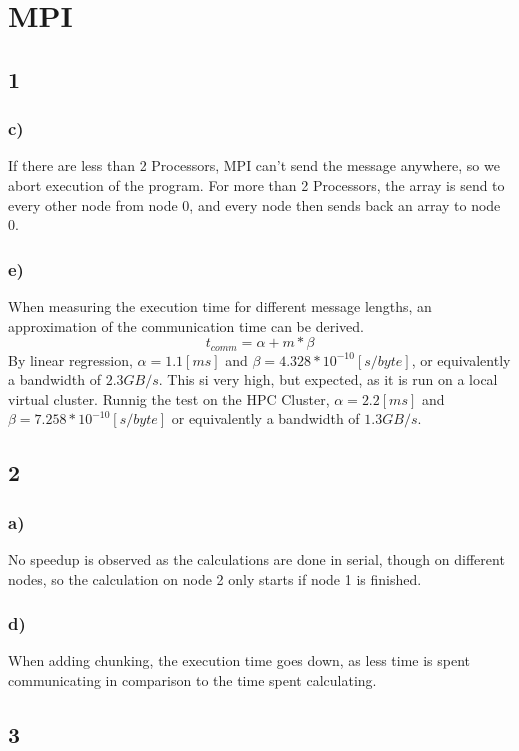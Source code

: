 \documentclass{article}
\begin{document}
\section{MPI}
\subsection{1}
\subsubsection{c)}
If there are less than 2 Processors, MPI can't send the message anywhere, so we abort execution of the program.
For more than 2 Processors, the array is send to every other node from node 0, and every node then sends back an array to node 0.
\subsubsection{e)}
When measuring the execution time for different message lengths, an approximation of the communication time can be derived.
\begin{equation}
	t_{comm} = \alpha + m * \beta
\end{equation}
By linear regression, $\alpha = 1.1 [ms]$ and $\beta = 4.328*10^{-10} [s/byte]$, or equivalently a bandwidth of $2.3 GB/s$. This si very high, but expected, as it is run on a local virtual cluster.
Runnig the test on the HPC Cluster, $\alpha = 2.2 [ms]$ and $\beta = 7.258*10^{-10} [s/byte]$ or equivalently a bandwidth of $1.3 GB/s$.

\subsection{2}
\subsubsection{a)}
No speedup is observed as the calculations are done in serial, though on different nodes, so the calculation on node 2 only starts if node 1 is finished.
\subsubsection{d)}
When adding chunking, the execution time goes down, as less time is spent communicating in comparison to the time spent calculating.

\subsection{3}

\end{document}
